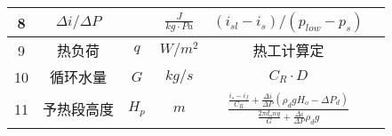 \begin{table}[H]
{\begin{tabular}{|c|c|c|c|c|c|}
            8    & $ \Delta i / \Delta P $     &             & $ \frac{J}{kg \cdot Pa} $ & $ (i_{sl} - i_{s}) / (p_{low} - p_{s}) $                                                                                                                                 &      \\ \hline
            9    & 热负荷                      & $ q $       & $ W/m^{2} $               & 热工计算定                                                                                                                                                               &      \\ \hline
            10   & 循环水量                    & $ G $       & $ kg/s $                  & $ C_R \cdot D $                                                                                                                                                          &      \\ \hline
            11   & 予热段高度                  & $ H_p $     & $ m $                     & $ \frac{\frac{i_{s}-i_{f}}{C_{R}}+\frac{\Delta i}{\Delta P}\left(\rho_{d} g H_{o}-\Delta P_{d}\right)}{\frac{2 \pi d_{o} n q}{G}+\frac{\Delta i}{\Delta P} \rho_{d} g} $ &      \\ \hline
        \end{tabular}
    }
\end{table}

